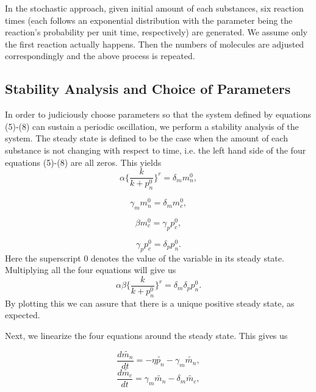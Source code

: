 \documentclass[12pt]{article}
\renewcommand{\(}{\left (}
\renewcommand{\)}{\right )}
\begin{document}
In the stochastic approach, given initial amount of each substances, six reaction times (each follows an exponential distribution with the parameter being the reaction's probability per unit time, respectively) are generated. We assume only the first reaction actually happens. Then the numbers of molecules are adjusted correspondingly and the above process is repeated.

\subsection{Stability Analysis and Choice of Parameters}
\hspace{5mm} In order to judiciously choose parameters so that the system defined by equations (5)-(8) can sustain a periodic oscillation, we perform a stability analysis of the system. The steady state is defined to be the case when the amount of each substance is not changing with respect to time, i.e. the left hand side of the four equations (5)-(8) are all zeros. This yields
\begin{equation}
	\alpha \{\frac{k}{k + p_n^0}\}^r = \delta_m m_n^0,
\end{equation}

\begin{equation}
    \gamma_m m_n^0 = \delta_m m_c^0,
\end{equation}

\begin{equation}
	\beta m_c^0 = \gamma_p p_c^0,
\end{equation}

\begin{equation}
	\gamma_p p_c^0 = \delta_p p_n^0.
\end{equation}
Here the superscript $0$ denotes the value of the variable in its steady state. Multiplying all the four equations will give us
\begin{equation}
    \alpha \beta \{\frac{k}{k + p_n^0}\}^r = \delta_m \delta_p p_n^0.
\end{equation}
By plotting this we can assure that there is a unique positive steady state, as expected.

Next, we linearize the four equations around the steady state. This gives us

\begin{equation}
    \frac{d\widetilde{m_n}}{dt} = -\eta \widetilde{p_n} - \gamma_m \widetilde{m_n},
\end{equation}
\begin{equation}
	\frac{d \widetilde{m_c}}{dt} = \gamma_m \widetilde{m_n} - \delta_m \widetilde{m_c},
\end{equation}
\end{document}
